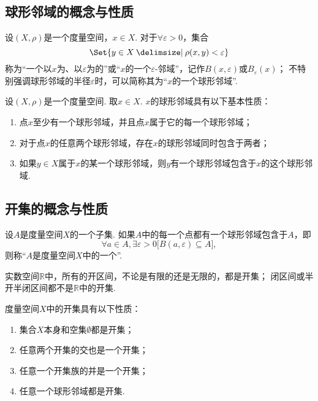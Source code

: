 \subsection{球形邻域的概念与性质}
\begin{definition}\label{definition:度量空间.球形邻域的概念}
设\((X,\rho)\)是一个度量空间，\(x \in X\).
对于\(\forall\varepsilon>0\)，集合\[
\Set{ y \in X \given \rho(x,y) < \varepsilon }
\]称为“一个以\(x\)为、以\(\varepsilon\)为的”或“\(x\)的一个\(\varepsilon\)-邻域”，记作\(B(x,\varepsilon)\)或\(B_{\varepsilon}(x)\)；
不特别强调球形邻域的半径\(\varepsilon\)时，可以简称其为“\(x\)的一个球形邻域”.
\end{definition}

\begin{theorem}\label{theorem:度量空间.球形邻域的性质}
设\((X,\rho)\)是一个度量空间.
取\(x \in X\).
\(x\)的球形邻域具有以下基本性质：
\begin{enumerate}
\item 点\(x\)至少有一个球形邻域，并且点\(x\)属于它的每一个球形邻域；
\item 对于点\(x\)的任意两个球形邻域，存在\(x\)的球形邻域同时包含于两者；
\item 如果\(y \in X\)属于\(x\)的某一个球形邻域，则\(y\)有一个球形邻域包含于\(x\)的这个球形邻域.
\end{enumerate}
\end{theorem}

\subsection{开集的概念与性质}
\begin{definition}\label{definition:度量空间.开集的概念}
设\(A\)是度量空间\(X\)的一个子集.
如果\(A\)中的每一个点都有一个球形邻域包含于\(A\)，即\[
\forall a \in A, \exists\varepsilon>0 \bigl[ B(a,\varepsilon) \subseteq A \bigr],
\]则称“\(A\)是度量空间\(X\)中的一个”.
\end{definition}

\begin{example}
实数空间\(\mathbb{R}\)中，所有的开区间，不论是有限的还是无限的，都是开集；
闭区间或半开半闭区间都不是\(\mathbb{R}\)中的开集.
\end{example}

\begin{theorem}\label{theorem:度量空间.开集的性质}
度量空间\(X\)中的开集具有以下性质：
\begin{enumerate}
\item 集合\(X\)本身和空集\(\emptyset\)都是开集；
\item 任意两个开集的交也是一个开集；
\item 任意一个开集族的并是一个开集；
\item 任意一个球形邻域都是开集.
\end{enumerate}
\end{theorem}

